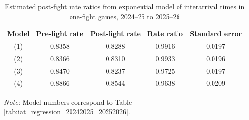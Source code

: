 \begin{table}[!h]
\centering
\caption{Estimated post-fight rate ratios from exponential model of interarrival times in one-fight games, 2024--25 to 2025--26}
\label{tab:post_fight_rate_ratios_20242025_20252026}

\begin{tabular}{ccccc}
\toprule
Model & Pre-fight rate & Post-fight rate & Rate ratio & Standard error \\
\midrule
(1) & 0.8358 & 0.8288 & 0.9916 & 0.0197 \\
(2) & 0.8366 & 0.8310 & 0.9933 & 0.0196 \\
(3) & 0.8470 & 0.8237 & 0.9725 & 0.0197 \\
(4) & 0.8866 & 0.8544 & 0.9638 & 0.0209 \\
\bottomrule
\end{tabular}

\vspace{0.4em}
\parbox{0.95\textwidth}{
\footnotesize
\textit{Note:} Model numbers correspond to Table \ref{tab:iat_regression_20242025_20252026}.
}
\end{table}
